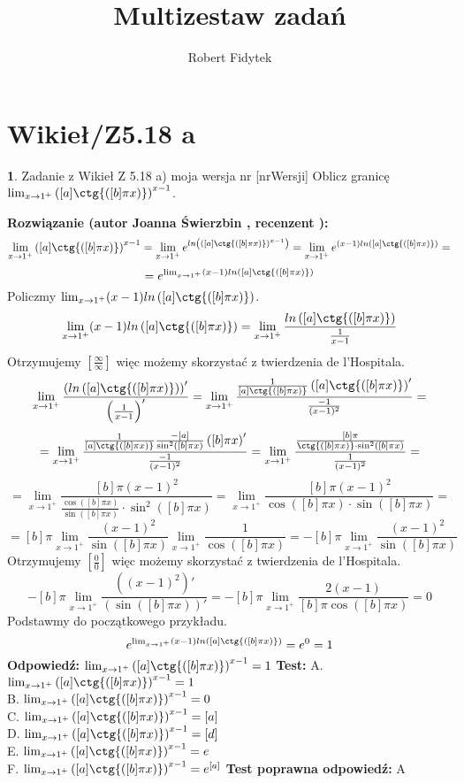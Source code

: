 \documentclass[12pt, a4paper]{article}
\title{Multizestaw zadań}
\author{Robert Fidytek}
\date{}
\theoremstyle{definition} %
\newtheorem{zad}{}
\newcommand{\kategoria}[1]{\section{#1}} %
\newcommand{\zadStart}[1]{\begin{zad}#1\newline} %
\newcommand{\zadStop}{\end{zad}}   %
\newcommand{\rozwStart}[2]{\noindent \textbf{Rozwiązanie (autor #1 , recenzent #2): }\newline} %
\newcommand{\rozwStop}{\newline}                                            %
\newcommand{\odpStart}{\noindent \textbf{Odpowiedź:}\newline}    %
\newcommand{\odpStop}{\newline}                                             %
\newcommand{\testStart}{\noindent \textbf{Test:}\newline} %
\newcommand{\testStop}{\newline} %
\newcommand{\kluczStart}{\noindent \textbf{Test poprawna odpowiedź:}\newline} %
\newcommand{\kluczStop}{\newline} %
\begin{document}
\maketitle


\kategoria{Wikieł/Z5.18 a}
\zadStart{Zadanie z Wikieł Z 5.18 a) moja wersja nr [nrWersji]}
Oblicz granicę $\lim_{x \rightarrow 1^+} \left( [a] \ctg{([b] \pi x)} \right)^{x-1}$.
\zadStop
\rozwStart{Joanna Świerzbin}{}
$$ \lim_{x \rightarrow 1^+} \left( [a] \ctg{([b] \pi x)} \right)^{x-1} = \lim_{x \rightarrow 1^+} e^{ln \left(\left( [a] \ctg{([b] \pi x)} \right)^{x-1}\right)}
= \lim_{x \rightarrow 1^+} e^{(x-1) ln\left( [a] \ctg{([b] \pi x)} \right)}=$$
$$= e^{ \lim_{x \rightarrow 1^+} (x-1) ln\left( [a] \ctg{([b] \pi x)} \right)}$$
Policzmy $ \lim_{x \rightarrow 1^+} (x-1) ln\left( [a] \ctg{([b] \pi x)} \right)$.
$$\lim_{x \rightarrow 1^+} (x-1) ln\left( [a] \ctg{([b] \pi x)} \right) = \lim_{x \rightarrow 1^+} \frac{ln\left( [a] \ctg{([b] \pi x)} \right)}{\frac{1}{x-1}}$$
Otrzymujemy $ \left[ \frac{\infty}{\infty} \right] $ więc możemy skorzystać z twierdzenia de l'Hospitala.
$$\lim_{x \rightarrow 1^+} \frac{\left(ln\left( [a] \ctg{([b] \pi x)} \right)\right)'}{\left(\frac{1}{x-1}\right)'} = \lim_{x \rightarrow 1^+} \frac{\frac{1}{ [a] \ctg{([b] \pi x)}}\left( [a] \ctg{([b] \pi x)} \right)'}{\frac{-1}{(x-1)^2}}=$$
$$= \lim_{x \rightarrow 1^+} \frac{\frac{1}{ [a] \ctg{([b] \pi x)}}\frac{-[a]}{\sin^2([b] \pi x )}\left([b] \pi x\right)'}{\frac{-1}{(x-1)^2}}=
\lim_{x \rightarrow 1^+} \frac{\frac{[b] \pi}{ \ctg{([b] \pi x)} \cdot \sin^2([b] \pi x )}}{\frac{1}{(x-1)^2}}=$$
$$ = \lim_{x \rightarrow 1^+} \frac{[b] \pi (x-1)^2}{ \frac{\cos{([b] \pi x)}}{\sin([b] \pi x)} \cdot \sin^2([b] \pi x )}
= \lim_{x \rightarrow 1^+} \frac{[b] \pi (x-1)^2}{ \cos{([b] \pi x)} \cdot \sin([b] \pi x )}=$$
$$ =[b] \pi \lim_{x \rightarrow 1^+} \frac{(x-1)^2}{\sin([b] \pi x )}  \lim_{x \rightarrow 1^+} \frac{1}{\cos{([b] \pi x)}}=- [b] \pi \lim_{x \rightarrow 1^+} \frac{(x-1)^2}{\sin([b] \pi x )}$$
Otrzymujemy $ \left[ \frac{0}{0} \right] $ więc możemy skorzystać z twierdzenia de l'Hospitala.
$$- [b] \pi \lim_{x \rightarrow 1^+} \frac{\left((x-1)^2\right)'}{\left(\sin([b] \pi x )\right)'}= - [b] \pi \lim_{x \rightarrow 1^+} \frac{2(x-1)}{[b] \pi \cos([b] \pi x )} = 0 $$
Podstawmy do początkowego przykładu.
$$e^{ \lim_{x \rightarrow 1^+} (x-1) ln\left( [a] \ctg{([b] \pi x)} \right)} = e^0 = 1$$
\rozwStop
\odpStart
$\lim_{x \rightarrow 1^+} \left( [a] \ctg{([b] \pi x)} \right)^{x-1} = 1$
\odpStop
\testStart
A. $\lim_{x \rightarrow 1^+} \left( [a] \ctg{([b] \pi x)} \right)^{x-1} = 1$\\
B. $\lim_{x \rightarrow 1^+} \left( [a] \ctg{([b] \pi x)} \right)^{x-1} = 0$\\
C. $\lim_{x \rightarrow 1^+} \left( [a] \ctg{([b] \pi x)} \right)^{x-1} = [a]$\\
D. $\lim_{x \rightarrow 1^+} \left( [a] \ctg{([b] \pi x)} \right)^{x-1} = [d]$\\
E. $\lim_{x \rightarrow 1^+} \left( [a] \ctg{([b] \pi x)} \right)^{x-1} = e$\\
F. $\lim_{x \rightarrow 1^+} \left( [a] \ctg{([b] \pi x)} \right)^{x-1} = e^{[a]}$
\testStop
\kluczStart
A
\kluczStop
\end{document}
